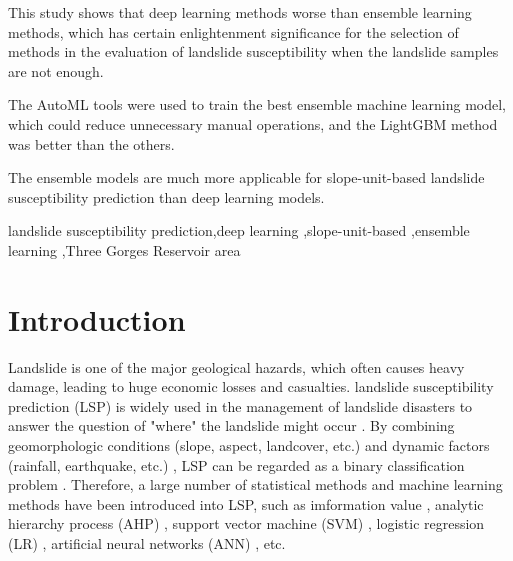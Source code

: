 \documentclass[a4paper,fleqn]{cas-sc}
\begin{document}
 
\begin{highlights}
\item This study shows that deep learning methods worse than ensemble learning methods, which has certain enlightenment significance for the selection of methods in the evaluation of landslide susceptibility when the landslide samples are not enough.
\item The AutoML tools were used to train the best ensemble machine learning model, which could reduce unnecessary manual operations, and the LightGBM method was better than the others.
\item The ensemble models are much more applicable for slope-unit-based landslide susceptibility prediction than deep learning models.
\end{highlights}

\begin{keywords}
landslide susceptibility prediction\sep deep learning \sep slope-unit-based \sep ensemble learning \sep Three Gorges Reservoir area
\end{keywords}

\maketitle 

\printcredits

\doublespacing

\section{Introduction}
Landslide is one of the major geological hazards, which often causes heavy damage, leading to huge economic losses and casualties. 
landslide susceptibility prediction (LSP) is widely used in the management of landslide disasters to answer the question of "where" the landslide might occur \citep{pourghasemi2018analysis}. 
By combining geomorphologic conditions (slope, aspect, landcover, etc.) and dynamic factors (rainfall, earthquake, etc.) , LSP can be regarded as a binary classification problem \citep{Song2018, Khan2021}. 
Therefore, a large number of statistical methods and machine learning methods have been introduced into LSP, such as imformation value \citep{chen2016comparison_LSM_INFORVALUE, Gao2006IV_Wanzhou}, analytic hierarchy process (AHP) \citep{Park2013Landslide_LSM_AHP, Kayastha2013Application_LSM_AHP, Pourghasemi2013Landslide_LSM_AHP, Yalcin2008Catena, Yoshimatsu2006}, support vector machine (SVM) \citep{Marjanovi2011Landslide_LSM_SVM}, logistic regression (LR) \citep{2017Chenp147160,Ayalew2005Geomorphology,Pourghasemi2013landslide_LR_AHP,Solaimani2013LSM_FR_LR,Tsangaratos2016Comparison_LR_Bayas,Ozdemir2013ALSM_FR_WE_LR,Wu2015LSM_LR_FR,Lee2007LSM_FR_LR_ANN,Das2010LSM_LR_RMC}, artificial neural networks (ANN) \citep{Sevgen2019S, Bui2016Landslides_SVM_ANN_LR}, etc. 
\end{document}
